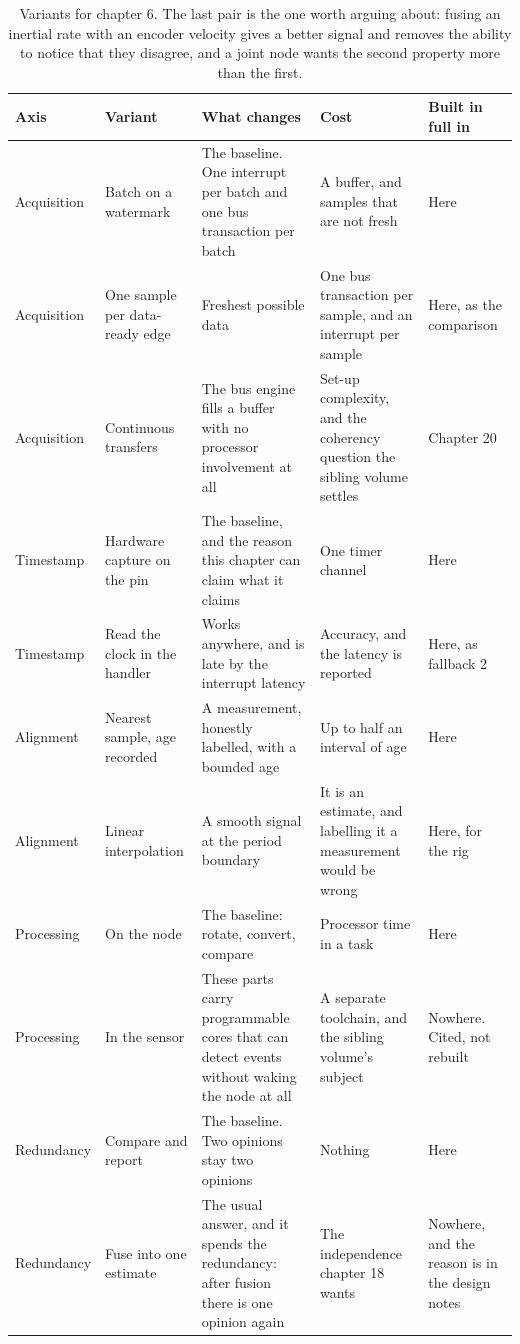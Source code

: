 \begin{table}[H]\centering\small
\begin{tabular}{p{24mm}p{26mm}p{44mm}p{22mm}p{20mm}}
\toprule
Axis & Variant & What changes & Cost & Built in full in \\
\midrule
Acquisition & Batch on a watermark & The baseline. One interrupt per batch and one bus transaction per batch & A buffer, and samples that are not fresh & Here \\
Acquisition & One sample per data-ready edge & Freshest possible data & One bus transaction per sample, and an interrupt per sample & Here, as the comparison \\
Acquisition & Continuous transfers & The bus engine fills a buffer with no processor involvement at all & Set-up complexity, and the coherency question the sibling volume settles & Chapter 20 \\
Timestamp & Hardware capture on the pin & The baseline, and the reason this chapter can claim what it claims & One timer channel & Here \\
Timestamp & Read the clock in the handler & Works anywhere, and is late by the interrupt latency & Accuracy, and the latency is reported & Here, as fallback 2 \\
Alignment & Nearest sample, age recorded & A measurement, honestly labelled, with a bounded age & Up to half an interval of age & Here \\
Alignment & Linear interpolation & A smooth signal at the period boundary & It is an estimate, and labelling it a measurement would be wrong & Here, for the rig \\
Processing & On the node & The baseline: rotate, convert, compare & Processor time in a task & Here \\
Processing & In the sensor & These parts carry programmable cores that can detect events without waking the node at all & A separate toolchain, and the sibling volume's subject & Nowhere. Cited, not rebuilt \\
Redundancy & Compare and report & The baseline. Two opinions stay two opinions & Nothing & Here \\
Redundancy & Fuse into one estimate & The usual answer, and it spends the redundancy: after fusion there is one opinion again & The independence chapter 18 wants & Nowhere, and the reason is in the design notes \\
\bottomrule
\end{tabular}
\caption{Variants for chapter 6. The last pair is the one worth arguing about: fusing an inertial rate with an encoder velocity gives a better signal and removes the ability to notice that they disagree, and a joint node wants the second property more than the first.}
\end{table}

